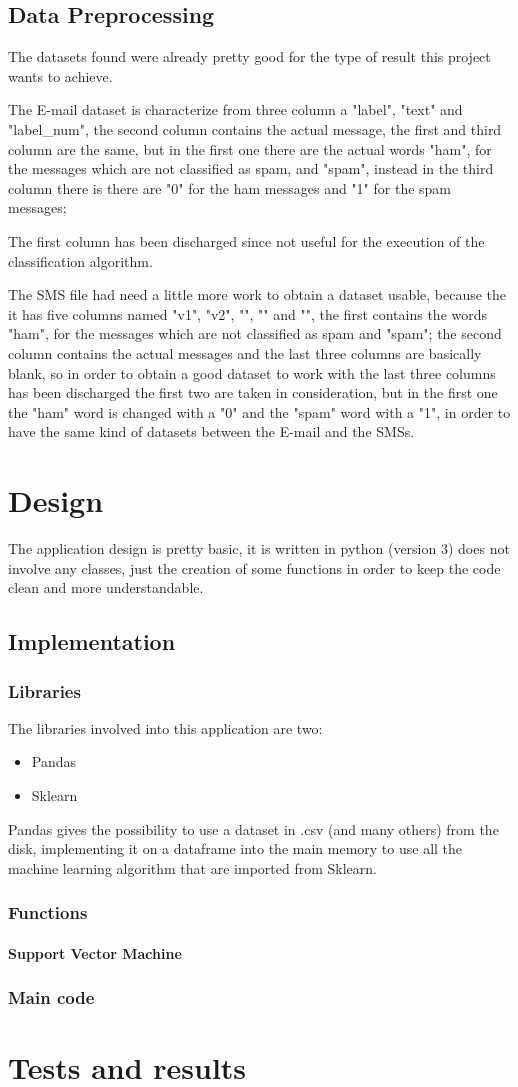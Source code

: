 \documentclass[a4paper]{report}
\begin{document}
\section{Data Preprocessing}
The datasets found were already pretty good for the type of result this project wants to achieve.

\noindent The E-mail dataset is characterize from three column a "label", "text" and "label\_num", the second column contains the actual message, the first and third column are the same, but in the first one there are the actual words "ham", for the messages which are not classified as spam, and "spam",  instead in the third column there is there are "0" for the ham messages and "1" for the spam messages;

\noindent The first column has been discharged since not useful for the execution of the classification algorithm.

\noindent The SMS file had need a little more work to obtain a dataset usable, because the it has five columns named "v1", "v2", "", "" and "", the first contains the words "ham", for the messages which are not classified as spam and "spam"; the second column contains the actual messages and the last three columns are basically blank, so in order to obtain a good dataset to work with the last three columns has been discharged the first two are taken in consideration, but in the first one the "ham" word is changed with a "0" and the "spam" word with a "1", in order to have the same kind of datasets between the E-mail and the SMSs.

\chapter{Design}
The application design is pretty basic, it is written in python (version 3) does not involve any classes, just the creation of some functions in order to keep the code clean and more understandable.
\section{Implementation}
\subsection{Libraries}
The libraries involved into this application are two:
\begin{itemize}
	\item Pandas
	\item Sklearn
\end{itemize}
Pandas gives the possibility to use a dataset in .csv (and many others) from the disk, implementing it on a dataframe into the main memory to use all the machine learning algorithm that are imported from Sklearn.
\subsection{Functions}
\subsubsection{Support Vector Machine}
\subsection{Main code}
\chapter{Tests and results}
\end{document}
